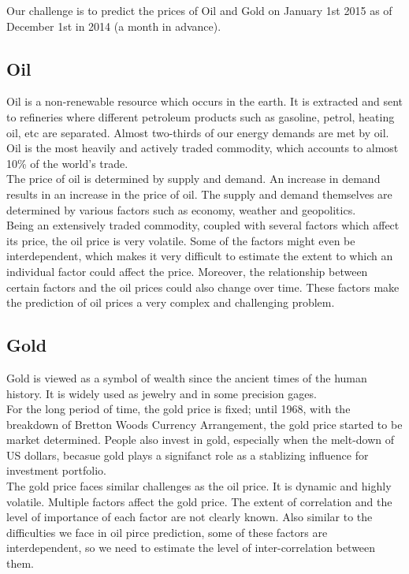 \documentclass[runningheads]{llncs}
\begin{document}
Our challenge is to predict the prices of Oil and Gold on January 1st 2015 as of December 1st in 2014 (a month in advance). 

\subsection{Oil}

Oil is a non-renewable resource which occurs in the earth. It is extracted and sent to refineries where different petroleum products such as gasoline, petrol, heating oil, etc are separated. Almost two-thirds of our energy demands are met by oil. Oil is the most heavily and actively traded commodity, which accounts to almost 10\% of the world's trade.\\

\noindent The price of oil is determined by supply and demand. An increase in demand results in an increase in the price of oil. The supply and demand themselves are determined by various factors such as economy, weather and geopolitics. \\

\noindent Being an extensively traded commodity, coupled with several factors which affect its price, the oil price is very volatile. Some of the factors might even be interdependent, which makes it very difficult to estimate the extent to which an individual factor could affect the price. Moreover, the relationship between certain factors and the oil prices could also change over time. These factors make the prediction of oil prices a very complex and challenging problem.

\subsection{Gold}
Gold is viewed as a symbol of wealth since the ancient times of the human history. It is widely used as jewelry and in some precision gages. \\

\noindent For the long period of time, the gold price is fixed; until 1968, with the breakdown of Bretton Woods Currency Arrangement, the gold price started to be market determined. People also invest in gold, especially when the melt-down of US dollars, becasue gold plays a signifanct role as a stablizing influence for investment portfolio. \\

\noindent The gold price faces similar challenges as the oil price. It is dynamic and highly volatile. Multiple factors affect the gold price. The extent of correlation and the level of importance of each factor are not clearly known. Also similar to the difficulties we face in oil pirce prediction, some of these factors are interdependent, so we need to estimate the level of inter-correlation between them. 
\end{document}
